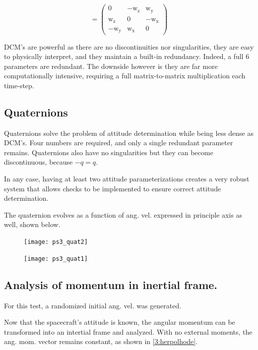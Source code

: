 \documentclass[12pt, letterpaper]{article}
\begin{document}
\begin{equation}
[\omega x]=\left(\begin{array}{ccc} 0 & - \mathrm{w_z} & \mathrm{w_y}\\ \mathrm{w_z} & 0 & - \mathrm{w_x}\\ - \mathrm{w_y} & \mathrm{w_x} & 0 \end{array}\right)
\label{3:wx}
\end{equation}

DCM's are powerful as there are no discontinuities nor singularities, they are easy to physically interpret, and they maintain a built-in redundancy. Indeed, a full 6 parameters are redundant. The downside however is they are far more computationally intensive, requiring a full matrix-to-matrix multiplication each time-step.

\subsection{Quaternions}
Quaternions solve the problem of attitude determination while being less dense as DCM's. Four numbers are required, and only a single redundant parameter remains. Quaternions also have no singularities but they can become discontinuous, because $-q=q$.

In any case, having at least two attitude parameterizations creates a very robust system that allows checks to be implemented to ensure correct attitude determination.

The quaternion evolves as a function of ang. vel. expressed in principle axis as well, shown below.

\begin{figure}[H]
	\centering
	\texttt{[image: ps3\_quat2]}
\end{figure}

\begin{figure}[H]
	\centering
	\texttt{[image: ps3\_quat1]}
\end{figure}


\subsection{Analysis of momentum in inertial frame.}

For this test, a randomized initial ang. vel. was generated.

Now that the spacecraft's attitude is known, the angular momentum can be transformed into an intertial frame and analyzed. With no external moments, the ang. mom. vector remains constant, as shown in \ref{3:herpolhode}. 
\end{document}
